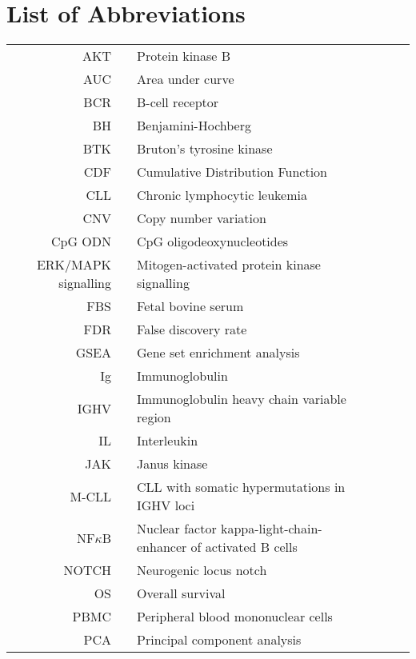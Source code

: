 \documentclass[11pt, a4paper, twosided]{book}
\begin{document}
\newpage
\tableofcontents
\clearpage

\newpage
\hypertarget{list-of-abbreviations}{%
\chapter*{List of Abbreviations}\label{list-of-abbreviations}}
\begin{tabular}{rp{0.2cm}lp{1cm}rp{0.2cm}l}
    AKT & & Protein kinase B \\
    AUC & & Area under curve \\
    BCR & & B-cell receptor \\
    BH & & Benjamini-Hochberg \\
    BTK & & Bruton’s tyrosine kinase \\
    CDF & & Cumulative Distribution Function \\
    CLL & & Chronic lymphocytic leukemia \\
    CNV & & Copy number variation \\
    CpG ODN & & CpG oligodeoxynucleotides \\
    ERK/MAPK signalling & & Mitogen-activated protein kinase signalling \\
    FBS & & Fetal bovine serum \\
    FDR & & False discovery rate \\
    GSEA & & Gene set enrichment analysis  \\
    Ig & & Immunoglobulin \\
    IGHV & & Immunoglobulin heavy chain variable region \\
    IL & & Interleukin \\
    JAK & & Janus kinase \\
    M-CLL & & CLL with somatic hypermutations in IGHV loci \\
    NF$\kappa$B & & Nuclear factor kappa-light-chain-enhancer of activated B cells \\
    NOTCH & & Neurogenic locus notch  \\
    OS & & Overall survival \\
    PBMC & & Peripheral blood mononuclear cells \\
    PCA & & Principal component analysis \\

\end{tabular}
\end{document}
